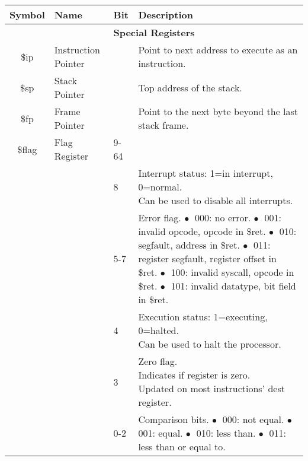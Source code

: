 \documentclass[10pt]{article}
\begin{document}
\bigskip
\begin{longtable}{|c|l|l|l|}
    \hline
    \textbf{Symbol} & \textbf{Name} & \textbf{Bit} & \textbf{Description} \\
    \hline
    \multicolumn{4}{|c|}{\textbf{Special Registers}} \\
    \hline
    \$ip & Instruction Pointer &  & Point to next address to execute as an instruction. \\
    \hline
    \$sp & Stack Pointer &  & Top address of the stack. \\
    \hline
    \$fp & Frame Pointer &  & Point to the next byte beyond the last stack frame. \\
    \hline
    \$flag & Flag Register & 9-64 & \\
    \cline{3-4}
    & & 8 & \makecell[l]{Interrupt status: 1=in interrupt, 0=normal.\\%
    Can be used to disable all interrupts.} \\
    \cline{3-4}
    & & 5-7 & \makecell[l]{Error flag.\\%
    \(\bullet\;\) 000: no error.\\%
    \(\bullet\;\) 001: invalid opcode, opcode in \$ret.\\%
    \(\bullet\;\) 010: segfault, address in \$ret.\\%
    \(\bullet\;\) 011: register segfault, register offset in \$ret.\\%
    \(\bullet\;\) 100: invalid syscall, opcode in \$ret.\\%
    \(\bullet\;\) 101: invalid datatype, bit field in \$ret.\\%
    } \\
    \cline{3-4}
    & & 4 & \makecell[l]{Execution status: 1=executing, 0=halted.\\%
    Can be used to halt the processor.} \\
    \cline{3-4}
    & & 3 & \makecell[l]{Zero flag.\\%
    Indicates if register is zero.\\%
    Updated on most instructions' dest register.} \\
    \cline{3-4}
    & & 0-2 & \makecell[l]{Comparison bits.\\%
    \(\bullet\;\) 000: not equal.\\%
    \(\bullet\;\) 001: equal.\\%
    \(\bullet\;\) 010: less than.\\%
    \(\bullet\;\) 011: less than or equal to.\\%
}
\end{longtable}
\end{document}
